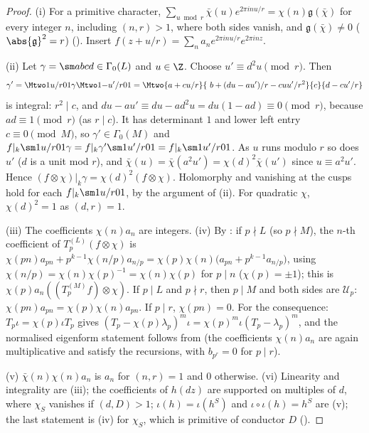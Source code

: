 \begin{proof}
(i) For a primitive character, $\sum_{u\bmod r}\bar\chi(u)e^{2\pi inu/r}=\chi(n)\mathfrak g(\bar\chi)$ for every integer $n$, including $(n,r)>1$, where both sides vanish, and $\mathfrak g(\bar\chi)\ne0$
($\abs{\mathfrak g}^2=r$) (). Insert $f(z+u/r)=\sum_na_ne^{2\pi inu/r}e^{2\pi inz}$.

(ii) Let $\gamma=\sm abcd\in\Gamma_0(L)$ and $u\in\Z$. Choose $u'\equiv d^2u\pmod r$. Then
\[
\gamma'=\Mtwo1{u/r}01\gamma\Mtwo1{-u'/r}01=\Mtwo{a+cu/r}{\ b+(du-au')/r-cuu'/r^2}{c}{d-cu'/r}
\]
is integral: $r^2\mid c$, and $du-au'\equiv du-ad^2u=du(1-ad)\equiv0\pmod r$, because $ad\equiv1\pmod r$ (as $r\mid c$). It has determinant $1$ and lower left entry $c\equiv0\pmod M$, so $\gamma'\in\Gamma_0(M)$ and
$f|_k\sm1{u/r}01\gamma=f|_k\gamma'\sm1{u'/r}01=f|_k\sm1{u'/r}01$. As $u$ runs modulo $r$ so does $u'$ ($d$ is a unit mod $r$), and $\bar\chi(u)=\bar\chi(a^2u')=\chi(d)^2\bar\chi(u')$ since $u\equiv a^2u'$. Hence
$(f\otimes\chi)|_k\gamma=\chi(d)^2(f\otimes\chi)$. Holomorphy and vanishing at the cusps hold for each $f|_k\sm1{u/r}01$, by the argument of (ii). For quadratic $\chi$,
$\chi(d)^2=1$ as $(d,r)=1$.

(iii) The coefficients $\chi(n)a_n$ are integers. (iv) By : if $p\nmid L$ (so $p\nmid M$), the $n$-th coefficient of $T_p^{(L)}(f\otimes\chi)$ is
$\chi(pn)a_{pn}+p^{k-1}\chi(n/p)a_{n/p}=\chi(p)\chi(n)\bigl(a_{pn}+p^{k-1}a_{n/p}\bigr)$, using $\chi(n/p)=\chi(n)\chi(p)^{-1}=\chi(n)\chi(p)$ for $p\mid n$ ($\chi(p)=\pm1$); this is $\chi(p)a_n((T_p^{(M)}f)\otimes\chi)$. If $p\mid L$ and
$p\nmid r$, then $p\mid M$ and both sides are $\mathcal U_p$: $\chi(pn)a_{pn}=\chi(p)\chi(n)a_{pn}$. If $p\mid r$, $\chi(pn)=0$. For the consequence: $T_p\iota=\chi(p)\iota T_p$ gives
$(T_p-\chi(p)\lambda_p)^m\iota=\chi(p)^m\iota(T_p-\lambda_p)^m$, and the normalised eigenform statement follows from  (the coefficients $\chi(n)a_n$ are again
multiplicative and satisfy the recursions, with $b_{p^r}=0$ for $p\mid r$).

(v) $\bar\chi(n)\chi(n)a_n$ is $a_n$ for $(n,r)=1$ and $0$ otherwise. (vi) Linearity and integrality are (iii); the coefficients of $h(dz)$ are supported on multiples of $d$, where $\chi_S$ vanishes if
$(d,D)>1$; $\iota(h)=\iota(h^S)$ and $\iota\circ\iota(h)=h^S$ are (v); the last statement is (iv) for $\chi_S$, which is primitive of conductor $D$ ().
\end{proof}

